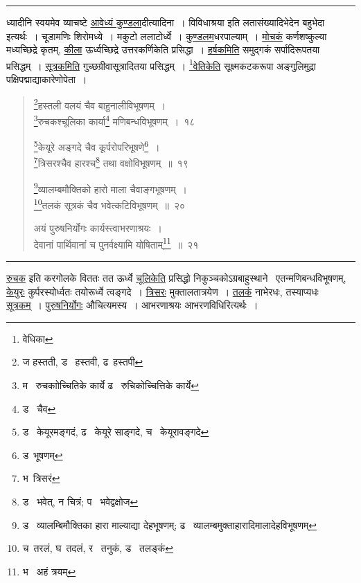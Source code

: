 \documentclass[11pt, openany]{book}
\begin{document}
\hrule

\vspace{2mm}
\noindent
ध्यादीनि स्वयमेव व्याचष्टे \underline{आवेध्यं कुण्डला}दीत्यादिना~। विविधाश्रया इति लतासंख्यादिभेदेन बहुभेदा इत्यर्थः~। चूडामणिः शिरोमध्ये~। मकुटो ललाटोर्ध्वे~। \underline{कुण्डलम}धरपाल्याम्~। \underline{मोचकं} कर्णशष्कुल्या मध्यच्छिद्रे कृतम्, \underline{कीला} ऊर्ध्वच्छिद्रे उत्तरकर्णिकेति प्रसिद्धा~। \underline{हर्षकमिति} समुद्गकं सर्पादिरूपतया प्रसिद्धम्~। \underline{सूत्रकमिति} गुच्छग्रीवासूत्रादितया प्रसिद्धम्~। \underline{\renewcommand{\thefootnote}{1}\footnote{वेधिका}वेतिकेति} सूक्ष्मकटकरूपा अङ्गुलिमुद्रा पक्षिपद्माद्याकारेणोपेता~।

\newpage

\begin{quote}
{\na \renewcommand{\thefootnote}{1}\footnote{ज हस्तती, ड \textendash\ हस्तवी, ढ\textendash\ हस्तपी}हस्तली वलयं चैव बाहुनालीविभूषणम्~।\\
\renewcommand{\thefootnote}{2}\footnote{म \textendash\ रुचकाोच्चितिके कार्ये ढ \textendash\ रुचिकोच्चित्तिके कार्ये}रुचकश्चूलिका कार्या\renewcommand{\thefootnote}{3}\footnote{ड \textendash\ चैव} मणिबन्धविभूषणम्~।~१८

\renewcommand{\thefootnote}{4}\footnote{ड \textendash\ केयूरमङ्गदं, ढ \textendash\ केयूरे साङ्गदे, च \textendash\ केयूरावङ्गदे}केयूरे अङ्गदे चैव कूर्परोपरिभूषणे\renewcommand{\thefootnote}{5}\footnote{ड\textendash\ भूषणम्}~।\\
\renewcommand{\thefootnote}{6}\footnote{भ\textendash\ त्रिसरं}त्रिसरश्चैव हारश्च\renewcommand{\thefootnote}{7}\footnote{ड \textendash\ भवेत्, न चित्रं; प \textendash\ भवेद्वक्षोज} तथा वक्षोविभूषणम्~॥~१९

\renewcommand{\thefootnote}{8}\footnote{ड \textendash\ व्यालम्बिमौक्तिका हारा माल्याद्या देहभूषणम्; ढ \textendash\ व्यालम्बमुक्ताहारादिमालादेहविभूषणम्}व्यालम्बमौक्तिको हारो माला चैवाङ्गभूषणम्~।\\
\renewcommand{\thefootnote}{9}\footnote{च\textendash\ तरलं, घ\textendash\ तदलं, र \textendash\ तनुकं, ड \textendash\ तलङ्कं}तलकं सूत्रकं चैव भवेत्कटिविभूषणम्~॥~२०

अयं पुरुषनिर्योगः कार्यस्त्वाभरणाश्रयः~।\\
देवानां पार्थिवानां च पुनर्वक्ष्यामि योषिताम्\renewcommand{\thefootnote}{10}\footnote{भ \textendash\ अहं त्रयम्}~॥~२१}
\end{quote}

\hrule

\vspace{2mm}
\underline{रुचक} इति करगोलके विततः तत ऊर्ध्वे \underline{चूलिकेति} प्रसिद्धो निकुञ्चकोऽग्रबाहुस्थाने \textendash\ एतन्मणिबन्धविभूषणम्, \underline{केयुरः} कुर्परस्योर्ध्वतः तयोरूर्ध्वे त्वङ्गदे~। \underline{त्रिसरः} मुक्तालतात्रयेण~। \underline{तलकं} नाभेरधः, तस्याप्यधः \underline{सूत्रकम्}~। \underline{पुरुषनिर्योगः} औचित्यमस्य~। आभरणाश्रयः आभरणविधिरित्यर्थः~।\\
\end{document}
